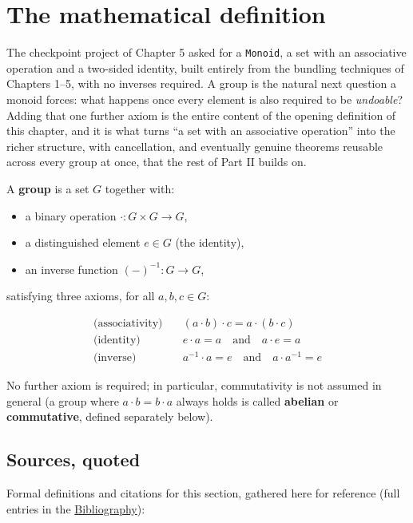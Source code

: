 \section{The mathematical definition}\label{sec:06-groups:01-definition:1}

The checkpoint project of Chapter 5 asked for a \texttt{Monoid}, a set with an associative operation and a two-sided identity, built entirely from the bundling techniques of Chapters 1--5, with no inverses required. A group is the natural next question a monoid forces: what happens once every element is also required to be \emph{undoable}? Adding that one further axiom is the entire content of the opening definition of this chapter, and it is what turns ``a set with an associative operation'' into the richer structure, with cancellation, and eventually genuine theorems reusable across every group at once, that the rest of Part II builds on.

A \textbf{group} is a set \(G\) together with:

\begin{itemize}
\tightlist
\item
  a binary operation \(\cdot : G \times G \to G\),
\item
  a distinguished element \(e \in G\) (the identity),
\item
  an inverse function \((-)^{-1} : G \to G\),
\end{itemize}

satisfying three axioms, for all \(a, b, c \in G\):

\[
\begin{aligned}
\text{(associativity)} &\quad (a \cdot b) \cdot c = a \cdot (b \cdot c) \\
\text{(identity)} &\quad e \cdot a = a \quad\text{and}\quad a \cdot e = a \\
\text{(inverse)} &\quad a^{-1} \cdot a = e \quad\text{and}\quad a \cdot a^{-1} = e
\end{aligned}
\]

No further axiom is required; in particular, commutativity is not assumed in general (a group where \(a \cdot b = b \cdot a\) always holds is called \textbf{abelian} or \textbf{commutative}, defined separately below).

\subsection{Sources, quoted}\label{sec:06-groups:01-definition:2}

Formal definitions and citations for this section, gathered here for reference (full entries in the \hyperref[sec:root:bibliography:1]{Bibliography}):


